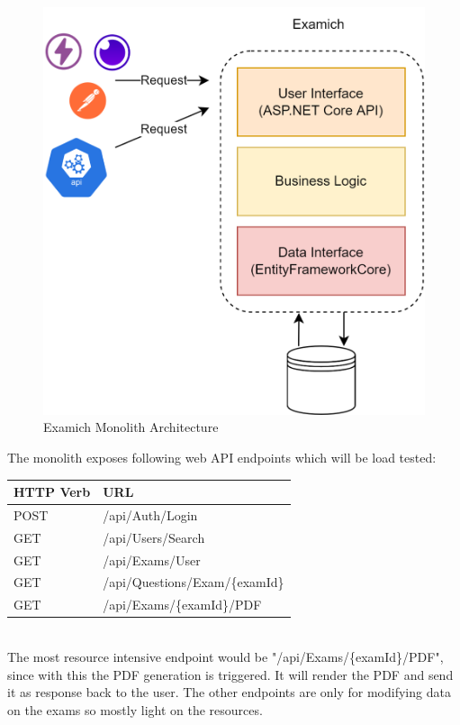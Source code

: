 \documentclass[BIF,Bachelor,nenglish]{twbook}%
\begin{document}
\begin{figure} [H]
 \begin{center}
    \includegraphics[width=0.6\linewidth]{img/ExamichMonolith.png}
 \end{center}
 \caption{Examich Monolith Architecture}
 \label{examichMonolith}
\end{figure}

\noindent
The monolith exposes following web \ac{API} endpoints which will be load tested:
\begin{table}[!ht]
    \centering
    \begin{tabular}{|l|l|}
    \hline
        \ac{HTTP} Verb & URL \\ \hline
        POST & /api/Auth/Login \\ \hline
        GET & /api/Users/Search \\ \hline
        GET & /api/Exams/User \\ \hline
        GET & /api/Questions/Exam/\{examId\} \\ \hline
        GET & /api/Exams/\{examId\}/PDF \\ \hline
    \end{tabular}
 \label{examichMonolithEndpoints}
\end{table}
\noindent
\\
The most resource intensive endpoint would be "/api/Exams/\{examId\}/PDF", since with this the PDF generation is triggered. It will render the PDF and send it as response back to the user. The other endpoints are only for modifying data on the exams so mostly light on the resources.
\end{document}
